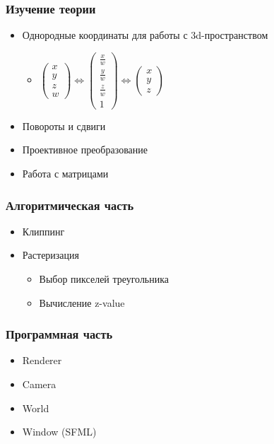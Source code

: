 \documentclass{beamer}
\begin{document}
\begin{frame}

\frametitle{Изучение теории}

\begin{itemize}

\item Однородные координаты для работы с 3d-пространством
\begin{itemize}
\item $\begin{pmatrix} x \\ y \\ z \\ w \end{pmatrix} \iff \begin{pmatrix} \frac{x}{w} \\ \frac{y}{w} \\ \frac{z}{w} \\ 1 \end{pmatrix} \iff \begin{pmatrix} x \\ y \\ z \end{pmatrix}$
\end{itemize}
\item Повороты и сдвиги
\item Проективное преобразование
\item Работа с матрицами

\end{itemize}


\end{frame}

\begin{frame}
\frametitle{Алгоритмическая часть}

\begin{itemize}
\item Клиппинг
\item Растеризация
\begin{itemize}
	\item Выбор пикселей треугольника
	\item Вычисление z-value
\end{itemize}
\end{itemize}

\end{frame}


\begin{frame}
\frametitle{Программная часть}

\begin{itemize}
\item Renderer
\item Camera
\item World
\item Window (SFML)
\end{itemize}

\end{frame}
\end{document}
